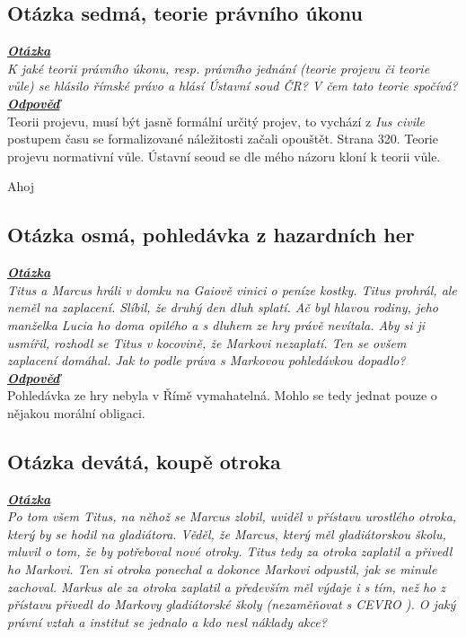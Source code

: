 \documentclass{article}
\begin{document}
\subsection{Otázka sedmá, teorie právního úkonu}
\textbf{\textit{\underline{Otázka}}}\\
\textit{K jaké teorii právního úkonu, resp. právního jednání (teorie projevu či teorie vůle) se hlásilo římské právo a hlásí Ústavní soud ČR? V čem tato teorie spočívá?}\\

\noindent\noindent\textbf{\textit{\underline{Odpověď}}}\\

Teorii projevu, musí být jasně formální určitý projev, to vychází z \textit{Ius civile} postupem času se formalizované náležitosti začali opouštět.
Strana 320.
Teorie projevu normativní vůle.
Ústavní seoud se dle mého názoru kloní k teorii vůle.

Ahoj

\subsection{Otázka osmá, pohledávka z hazardních her}
\textbf{\textit{\underline{Otázka}}}\\
\textit{Titus a Marcus hráli v domku na Gaiově vinici o peníze kostky. Titus prohrál, ale neměl na zaplacení. Slíbil, že druhý den dluh splatí. Ač byl hlavou rodiny, jeho manželka Lucia ho doma opilého a s dluhem ze hry právě nevítala. Aby si ji usmířil, rozhodl se Titus v kocovině, že Markovi nezaplatí. Ten se ovšem zaplacení domáhal. Jak to podle práva s Markovou pohledávkou dopadlo?}\\

\noindent\noindent\textbf{\textit{\underline{Odpověď}}}\\

Pohledávka ze hry nebyla v Římě vymahatelná. Mohlo se tedy jednat pouze o nějakou morální obligaci.

\subsection{Otázka devátá, koupě otroka}
\textbf{\textit{\underline{Otázka}}}\\
\textit{Po tom všem Titus, na něhož se Marcus zlobil, uviděl v přístavu urostlého otroka, který by se hodil na gladiátora. Věděl, že Marcus, který měl gladiátorskou školu, mluvil o tom, že by potřeboval nové otroky. Titus tedy za otroka zaplatil a přivedl ho Markovi. Ten si otroka ponechal a dokonce Markovi odpustil, jak se minule zachoval. Markus ale za otroka zaplatil a především měl výdaje i s tím, než ho z přístavu přivedl do Markovy gladiátorské školy (nezaměňovat s CEVRO ). O jaký právní vztah a institut se jednalo a kdo nesl náklady akce?}\\
\end{document}
